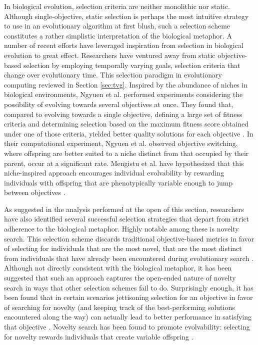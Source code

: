 In biological evolution, selection criteria are neither monolithic nor static.
Although single-objective, static selection is perhaps the most intuitive strategy to use in an evolutionary algorithm at first blush, such a selection scheme constitutes a rather simplistic interpretation of the biological metaphor.
A number of recent efforts have leveraged inspiration from selection in biological evolution to great effect.
Researchers have ventured away from static objective-based selection by employing temporally varying goals, selection criteria that change over evolutionary time.
This selection paradigm in evolutionary computing reviewed in Section \ref{sec:tvg}.
Inspired by the abundance of niches in biological environments, Ngyuen et al. performed experiments considering the possibility of evolving towards several objectives at once.
They found that, compared to evolving towards a single objective, defining a large set of fitness criteria and determining selection based on the maximum fitness score obtained under one of those criteria, yielded better quality solutions for each objective \cite{Nguyen2015InnovationLearning}.
In their computational experiment, Ngyuen et al. observed objective switching, where offspring are better suited to a niche distinct from that occupied by their parent, occur at a significant rate.
Mengistu et al. have hypothesized that this niche-inspired approach encourages individual evolvability by rewarding individuals with offspring that are  phenotypically variable enough to jump between objectives \cite{Mengistu2016EvolvabilityIt}.

As suggested in the analysis performed at the open of this section, researchers have also identified several successful selection strategies that depart from strict adherence to the biological metaphor.
Highly notable among these is novelty search.
This selection scheme discards traditional objective-based metrics in favor of selecting for individuals that are the most novel, that are the most distinct from individuals that have already been encountered during evolutionary search \cite{Lehman2008ExploitingNovelty}.
Although not directly consistent with the biological metaphor, it has been suggested that such an approach captures the open-ended nature of novelty search in ways that other selection schemes fail to do.
Surprisingly enough, it has been found that in certain scenarios jettisoning selection for an objective in favor of searching for novelty (and keeping track of the best-performing solutions encountered along the way) can actually lead to better performance in satisfying that objective \cite{Lehman2008ExploitingNovelty}.
Novelty search has been found to promote evolvability: selecting for novelty rewards individuals that create variable offspring \cite{Lehman2011ImprovingSelf-Adaptation}.


